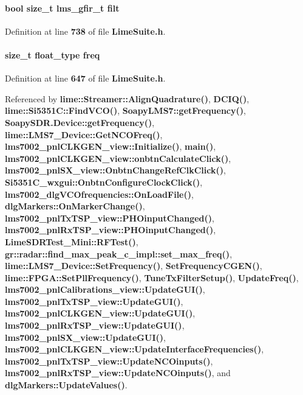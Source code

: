 \paragraph[{filt}]{\setlength{\rightskip}{0pt plus 5cm}bool size\+\_\+t {\bf lms\+\_\+gfir\+\_\+t} filt}\label{group__FN__ADVANCED_gaf8edd4fa11a3af99d15a1d2cf2ef5d9e}


Definition at line {\bf 738} of file {\bf Lime\+Suite.\+h}.

\paragraph[{freq}]{\setlength{\rightskip}{0pt plus 5cm}size\+\_\+t {\bf float\+\_\+type} freq}\label{group__FN__ADVANCED_gaaf6fa8c069646fc0704d9f667dc34e7c}


Definition at line {\bf 647} of file {\bf Lime\+Suite.\+h}.



Referenced by {\bf lime\+::\+Streamer\+::\+Align\+Quadrature()}, {\bf D\+C\+I\+Q()}, {\bf lime\+::\+Si5351\+C\+::\+Find\+V\+C\+O()}, {\bf Soapy\+L\+M\+S7\+::get\+Frequency()}, {\bf Soapy\+S\+D\+R.\+Device\+::get\+Frequency()}, {\bf lime\+::\+L\+M\+S7\+\_\+\+Device\+::\+Get\+N\+C\+O\+Freq()}, {\bf lms7002\+\_\+pnl\+C\+L\+K\+G\+E\+N\+\_\+view\+::\+Initialize()}, {\bf main()}, {\bf lms7002\+\_\+pnl\+C\+L\+K\+G\+E\+N\+\_\+view\+::onbtn\+Calculate\+Click()}, {\bf lms7002\+\_\+pnl\+S\+X\+\_\+view\+::\+Onbtn\+Change\+Ref\+Clk\+Click()}, {\bf Si5351\+C\+\_\+wxgui\+::\+Onbtn\+Configure\+Clock\+Click()}, {\bf lms7002\+\_\+dlg\+V\+C\+Ofrequencies\+::\+On\+Load\+File()}, {\bf dlg\+Markers\+::\+On\+Marker\+Change()}, {\bf lms7002\+\_\+pnl\+Tx\+T\+S\+P\+\_\+view\+::\+P\+H\+Oinput\+Changed()}, {\bf lms7002\+\_\+pnl\+Rx\+T\+S\+P\+\_\+view\+::\+P\+H\+Oinput\+Changed()}, {\bf Lime\+S\+D\+R\+Test\+\_\+\+Mini\+::\+R\+F\+Test()}, {\bf gr\+::radar\+::find\+\_\+max\+\_\+peak\+\_\+c\+\_\+impl\+::set\+\_\+max\+\_\+freq()}, {\bf lime\+::\+L\+M\+S7\+\_\+\+Device\+::\+Set\+Frequency()}, {\bf Set\+Frequency\+C\+G\+E\+N()}, {\bf lime\+::\+F\+P\+G\+A\+::\+Set\+Pll\+Frequency()}, {\bf Tune\+Tx\+Filter\+Setup()}, {\bf Update\+Freq()}, {\bf lms7002\+\_\+pnl\+Calibrations\+\_\+view\+::\+Update\+G\+U\+I()}, {\bf lms7002\+\_\+pnl\+Tx\+T\+S\+P\+\_\+view\+::\+Update\+G\+U\+I()}, {\bf lms7002\+\_\+pnl\+C\+L\+K\+G\+E\+N\+\_\+view\+::\+Update\+G\+U\+I()}, {\bf lms7002\+\_\+pnl\+Rx\+T\+S\+P\+\_\+view\+::\+Update\+G\+U\+I()}, {\bf lms7002\+\_\+pnl\+S\+X\+\_\+view\+::\+Update\+G\+U\+I()}, {\bf lms7002\+\_\+pnl\+C\+L\+K\+G\+E\+N\+\_\+view\+::\+Update\+Interface\+Frequencies()}, {\bf lms7002\+\_\+pnl\+Tx\+T\+S\+P\+\_\+view\+::\+Update\+N\+C\+Oinputs()}, {\bf lms7002\+\_\+pnl\+Rx\+T\+S\+P\+\_\+view\+::\+Update\+N\+C\+Oinputs()}, and {\bf dlg\+Markers\+::\+Update\+Values()}.

